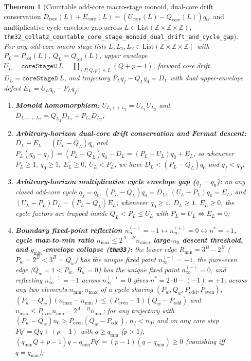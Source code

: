 \documentclass[11pt,a4paper]{article}
\newtheorem{theorem}{Theorem}[section]
\theoremstyle{definition}
\theoremstyle{remark}
\begin{document}
\begin{theorem}[Countable odd-core macro-stage monoid, dual-core drift conservation $D_{\mathrm{core}}(L) + E_{\mathrm{core}}(L) = (U_{\mathrm{core}}(L) - Q_{\mathrm{core}}(L))q_0$, and multiplicative cycle envelope gap across $L \in \mathrm{List}(\mathbb{Z}\times\mathbb{Z}\times\mathbb{Z})$, \texttt{thm32\_collatz\_countable\_core\_stage\_monoid\_dual\_drift\_and\_cycle\_gap}]
\label{thm:countable-core-stage-monoid}
For any odd-core macro-stage lists $L,L_1,L_2 \in \mathrm{List}(\mathbb{Z}\times\mathbb{Z}\times\mathbb{Z})$ with $P_L = P_{\mathrm{tot}}(L)$, $Q_L = Q_{\mathrm{tot}}(L)$, upper envelope $U_L = \texttt{coreStageU}\ L = \prod_{(P,Q,p)\in L}(Q+p-1)$, forward core drift $D_L = \texttt{coreStageD}\ L$, and trajectory $P_L q_f - Q_L q_0 = D_L$ with dual upper-envelope defect $E_L = U_L q_0 - P_L q_f$:
\begin{enumerate}[label=\textbf{(\roman*)},leftmargin=*,noitemsep]
\item \textbf{Monoid homomorphism:} $U_{L_1\mathbin{++}L_2} = U_{L_1}U_{L_2}$ and $D_{L_1\mathbin{++}L_2} = Q_{L_2}D_{L_1} + P_{L_1}D_{L_2}$;
\item \textbf{Arbitrary-horizon dual-core drift conservation and Fermat descent:}
  $D_L + E_L = (U_L - Q_L)q_0$ and $P_L(q_0 - q_f) = (P_L - Q_L)q_0 - D_L = (P_L - U_L)q_0 + E_L$, so whenever $P_L \ge 1,\ q_0 \ge 1,\ E_L \ge 0,\ U_L < P_L$, we have $D_L < (P_L - Q_L)q_0$ and $q_f < q_0$;
\item \textbf{Arbitrary-horizon multiplicative cycle envelope gap ($q_f = q_0$):}
  on any closed odd-core cycle $q_f = q_0$, $(P_L - Q_L)q_0 = D_L$, $(U_L - P_L)q_0 = E_L$, and $(U_L - P_L)D_L = (P_L - Q_L)E_L$; whenever $q_0 \ge 1,\ D_L \ge 1,\ E_L \ge 0$, the cycle factors are trapped inside $Q_L < P_L \le U_L$ with $P_L = U_L \iff E_L = 0$;
\item \textbf{Boundary fixed-point reflection $n_\infty^{(-)}=-1 \leftrightarrow n_\infty^{(+)}=0 \leftrightarrow n^*=+1$, cycle max-to-min ratio $n_{\max} \le 2^{A-B}n_{\min}$, large-$n_0$ descent threshold, and $q_{\min}$-envelope collapse (\texttt{thm33}):}
  the lower edge $R_{\min}=3^B-2^B$ ($P_w=2^B < 3^B=Q_w$) has the unique fixed point $n_\infty^{(-)}=-1$, the pure-even edge ($Q_w=1 < P_w,\ R_w=0$) has the unique fixed point $n_\infty^{(+)}=0$, and reflecting $n_\infty^{(-)}=-1$ across $n_\infty^{(+)}=0$ gives $n^*=2\cdot 0 - (-1) = +1$; across any two elements $n_{\min},n_{\max}$ of a cycle sharing $(P_w,Q_w,P_{\mathrm{odd}},P_{\mathrm{even}})$, $(P_w-Q_w)(n_{\max}-n_{\min}) \le (P_{\mathrm{even}}-1)(Q_w-P_{\mathrm{odd}})$ and $n_{\max} \le P_{\mathrm{even}} n_{\min} = 2^{A-B}n_{\min}$; for any trajectory with $(P_w-Q_w)n_0 > P_{\mathrm{even}}(Q_w-P_{\mathrm{odd}})$, $n_f < n_0$; and on any core step $P q' = Q q + (p-1)$ with $q \ge q_{\min}$ ($p > 1$), $(q_{\min}Q+p-1)q - q_{\min}P q' = (p-1)(q-q_{\min}) \ge 0$ (vanishing iff $q = q_{\min}$);

\end{enumerate}
\end{theorem}
\end{document}

